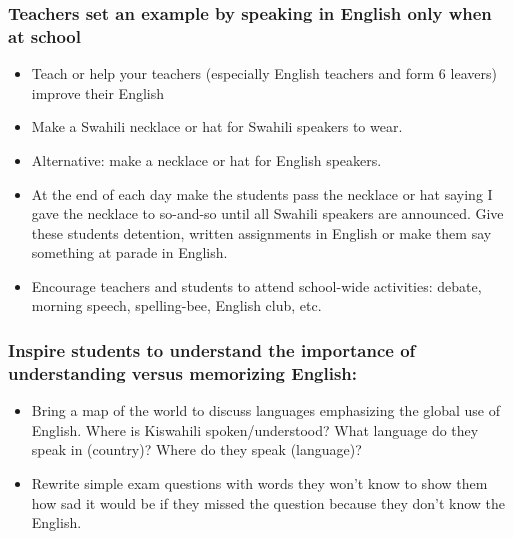 \documentclass[12pt,a4paper]{report}
\begin{document}
\subsubsection{Teachers set an example by speaking in English only when at school}
\begin{itemize}
\item{Teach or help your teachers (especially English teachers and form 6 leavers) improve their English}

\item{Make a Swahili necklace or hat for Swahili speakers to wear.}

\item{Alternative: make a necklace or hat for English speakers.}

\item{At the end of each day make the students pass the necklace or hat saying I gave the necklace to so-and-so until all Swahili speakers are announced. Give these students detention, written assignments in English or make them say something at parade in English.}

\item{Encourage teachers and students to attend school-wide activities: debate, morning speech, spelling-bee, English club, etc.}
\end{itemize}

\subsubsection{Inspire students to understand the importance of understanding versus memorizing English:}
\begin{itemize}
\item{Bring a map of the world to discuss languages emphasizing the global use of English. Where is Kiswahili spoken/understood? What language do they speak in (country)? Where do they speak (language)?}

\item{Rewrite simple exam questions with words they won’t know to show them how sad it would be if they missed the question because they don’t know the English.}
\end{itemize}
\end{document}
